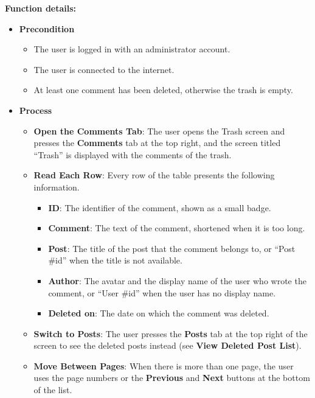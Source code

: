 \textbf{Function details:}
\begin{itemize}[leftmargin=1.6em,topsep=4pt,itemsep=3pt,parsep=0pt,label=$\bullet$]
    \item \textbf{Precondition}
        \begin{itemize}[leftmargin=2.2em,topsep=2pt,itemsep=3pt,parsep=0pt,label=$\circ$]
            \item The user is logged in with an administrator account.
            \item The user is connected to the internet.
            \item At least one comment has been deleted, otherwise the trash is empty.
        \end{itemize}
    \item \textbf{Process}
        \begin{itemize}[leftmargin=2.2em,topsep=2pt,itemsep=3pt,parsep=0pt,label=$\circ$]
            \item \textbf{Open the Comments Tab}: The user opens the Trash screen and presses the \textbf{Comments} tab at the top right, and the screen titled ``Trash'' is displayed with the comments of the trash.
            \item \textbf{Read Each Row}: Every row of the table presents the following information.
                \begin{itemize}[leftmargin=2.2em,topsep=2pt,itemsep=3pt,parsep=0pt,label=$\blacksquare$]
                    \item \textbf{ID}: The identifier of the comment, shown as a small badge.
                    \item \textbf{Comment}: The text of the comment, shortened when it is too long.
                    \item \textbf{Post}: The title of the post that the comment belongs to, or ``Post \#id'' when the title is not available.
                    \item \textbf{Author}: The avatar and the display name of the user who wrote the comment, or ``User \#id'' when the user has no display name.
                    \item \textbf{Deleted on}: The date on which the comment was deleted.
                \end{itemize}
            \item \textbf{Switch to Posts}: The user presses the \textbf{Posts} tab at the top right of the screen to see the deleted posts instead (see \textbf{View Deleted Post List}).
            \item \textbf{Move Between Pages}: When there is more than one page, the user uses the page numbers or the \textbf{Previous} and \textbf{Next} buttons at the bottom of the list.

\end{itemize}
\end{itemize}
